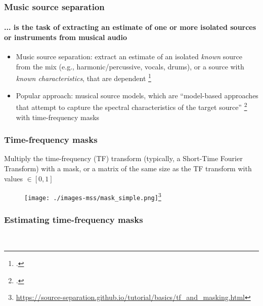 \documentclass[usenames,dvipsnames]{beamer}
\begin{document}
\begin{frame}
	\frametitle{Music source separation}
	\framesubtitle{... is the task of extracting an estimate of one or more isolated sources or instruments from musical audio}
	\begin{itemize}
	       \item
		       Music source separation: extract an estimate of an isolated \textit{known} source from the mix (e.g., harmonic/percussive, vocals, drums), or a source with \textit{known characteristics}, that are dependent \footcite{musicsepintro1}
	       \item
			Popular approach: musical source models, which are ``model-based approaches that attempt to capture the spectral characteristics of the target source'' \footcite[36]{musicsepgood} with time-frequency masks
	\end{itemize}
	\begin{figure}
		\centering
		\vspace{-1.25em}
	\end{figure}
\end{frame}

\begin{frame}
	\frametitle{Time-frequency masks}
	Multiply the time-frequency (TF) transform (typically, a Short-Time Fourier Transform) with a mask, or a matrix of the same size as the TF transform with values $\in [0, 1]$
	\begin{figure}
		\centering
		\texttt{[image: ./images-mss/mask\_simple.png]}\footnote{\url{https://source-separation.github.io/tutorial/basics/tf_and_masking.html}}
	\end{figure}
\end{frame}

\begin{frame}
	\frametitle{Estimating time-frequency masks}
	\begin{figure}
		\setcounter{subfigure}{0}
		\vspace{-1em}
		\centering
		\\
		\vspace{-0.5em}
		\vspace{-0.5em}
	\end{figure}
\end{frame}
\end{document}
